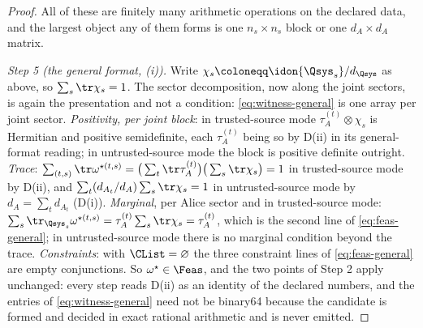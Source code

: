 \begin{proof}
All of these are finitely many arithmetic operations on the declared data, and
the largest object any of them forms is one $n_s\times n_s$ block or one
$d_A\times d_A$ matrix.

\emph{Step 5 (the general format, (i)).} Write
$\chi_s\coloneqq\idon{\Qsys_s}/d_{\Qsys}$ as above, so
$\sum_s\tr\chi_s=1$. The sector decomposition, now along the joint sectors,
is again the presentation and not a condition: \eqref{eq:witness-general} is
one array per joint sector. \emph{Positivity, per joint block}: in
trusted-source mode $\tau^{(t)}_A\otimes\chi_s$ is Hermitian and positive
semidefinite, each $\tau^{(t)}_A$ being so by D(ii) in its general-format
reading; in untrusted-source mode the block is positive definite outright.
\emph{Trace}: $\sum_{(t,s)}\tr\omega^{\star(t,s)}
=\big(\sum_t\tr\tau^{(t)}_A\big)\big(\sum_s\tr\chi_s\big)=1$ in
trusted-source mode by D(ii), and $\sum_t(d_{A_t}/d_A)\sum_s\tr\chi_s=1$ in
untrusted-source mode by $d_A=\sum_td_{A_t}$ (D(i)). \emph{Marginal}, per
Alice sector and in trusted-source mode:
$\sum_s\tr_{\Qsys_s}\omega^{\star(t,s)}
=\tau^{(t)}_A\sum_s\tr\chi_s=\tau^{(t)}_A$, which is the second line of
\eqref{eq:feas-general}; in untrusted-source mode there is no marginal
condition beyond the trace. \emph{Constraints}: with $\CList=\varnothing$ the
three constraint lines of \eqref{eq:feas-general} are empty conjunctions. So
$\omega^{\star}\in\Feas$, and the two points of Step 2 apply unchanged: every
step reads D(ii) as an identity of the declared numbers, and the entries of
\eqref{eq:witness-general} need not be binary64 because the candidate is
formed and decided in exact rational arithmetic and is never emitted.


\end{proof}
